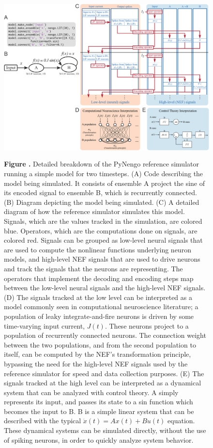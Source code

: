 \documentclass{frontiersSCNS}
\begin{document}
\begin{figure}
\begin{center}
  \includegraphics[width=\textwidth]{sim}
\end{center}
 \textbf{\label{fig:sim} Figure .}{
   Detailed breakdown of the PyNengo reference simulator
   running a simple model for two timesteps.
   (A) Code describing the model being simulated.
   It consists of ensemble A project the sine of its
   encoded signal to ensemble B,
   which is recurrently connected.
   (B) Diagram depicting the model being simulated.
   (C) A detailed diagram of how the reference simulator
   simulates this model. Signals, which are the values
   tracked in the simulation, are colored blue.
   Operators, which are the computations done on signals,
   are colored red.
   Signals can be grouped as low-level neural signals
   that are used to compute the nonlinear functions
   underlying neuron models,
   and high-level NEF signals that are used to
   drive neurons and track the signals
   that the neurons are representing.
   The operators that implement the decoding
   and encoding steps map between
   the low-level neural signals
   and the high-level NEF signals.
   (D) The signals tracked at the low level
   can be interpreted as a model
   commonly seen in computational neuroscience literature;
   a population of leaky integrate-and-fire neurons
   is driven by some time-varying input current, $J(t)$.
   These neurons project to a population
   of recurrently connected neurons.
   The connection weight between the two populations,
   and from the second population to itself,
   can be computed by the NEF's transformation
   principle, bypassing the need for
   the high-level NEF signals
   used by the reference simulator
   for speed and data collection purposes.
   (E) The signals tracked at the high level
   can be interpreted as a dynamical system
   that can be analyzed with control theory.
   A simply represents its input,
   and passes its state to a sin function
   which becomes the input to B.
   B is a simple linear system
   that can be described with the typical
   $\dot{x}(t) = A x(t) + B u(t)$ equation.
   These dynamical systems can be simulated
   directly, without the use of spiking neurons,
   in order to quickly analyze system behavior.}
\end{figure}
\end{document}
